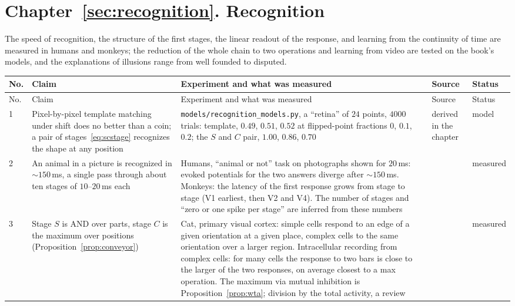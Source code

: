 \section{Chapter~\ref{sec:recognition}. Recognition}

The speed of recognition, the structure of the first stages, the linear readout of the response, and learning from the continuity of time are measured in humans and monkeys; the reduction of the whole chain to two operations and learning from video are tested on the book's models, and the explanations of illusions range from well founded to disputed.

{\footnotesize
\setlength{\tabcolsep}{3pt}\renewcommand{\arraystretch}{1.15}
\begin{longtable}{>{\raggedright}p{0.5cm}>{\raggedright}p{4.0cm}>{\raggedright}p{5.6cm}>{\raggedright}p{2.3cm}>{\raggedright\arraybackslash}p{1.7cm}}
\toprule
No. & Claim & Experiment and what was measured & Source & Status \\
\midrule\endfirsthead
\toprule
No. & Claim & Experiment and what was measured & Source & Status \\
\midrule\endhead
1 & Pixel-by-pixel template matching under shift does no better than a coin; a pair of stages~\eqref{eq:scstage} recognizes the shape at any position & \texttt{models/\allowbreak recognition\_models.py}, a ``retina'' of $24$ points, $4000$ trials: template, $0.49$, $0.51$, $0.52$ at flipped-point fractions $0$, $0.1$, $0.2$; the $S$ and $C$ pair, $1.00$, $0.86$, $0.70$ & derived in the chapter & model \\
2 & An animal in a picture is recognized in $\sim150$\,ms, a single pass through about ten stages of $10$--$20$\,ms each & Humans, ``animal or not'' task on photographs shown for $20$\,ms: evoked potentials for the two answers diverge after $\sim150$\,ms. Monkeys: the latency of the first response grows from stage to stage (V1 earliest, then V2 and V4). The number of stages and ``zero or one spike per stage'' are inferred from these numbers & \cite{Thorpe1996,Schmolesky1998} & measured \\
3 & Stage $S$ is AND over parts, stage $C$ is the maximum over positions (Proposition~\ref{prop:conveyor}) & Cat, primary visual cortex: simple cells respond to an edge of a given orientation at a given place, complex cells to the same orientation over a larger region. Intracellular recording from complex cells: for many cells the response to two bars is close to the larger of the two responses, on average closest to a max operation. The maximum via mutual inhibition is Proposition~\ref{prop:wta}; division by the total activity, a review & \cite{HubelWiesel1962,Lampl2004,Carandini2012} & measured \\

\end{longtable}}
